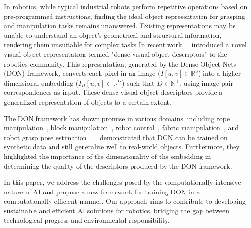In robotics, while typical industrial robots perform repetitive operations based on pre-programmed instructions,
finding the ideal object representation for grasping and manipulation tasks remains unanswered.
Existing representations may be unable to understand an object's geometrical and structural information, rendering them unsuitable for complex tasks
In recent work, \citeauthor{florence2018dense}~\cite{florence2018dense} introduced a novel visual object representation termed "dense visual object descriptors" to the robotics community.
This representation, generated by the Dense Object Nets (DON) framework, converts each pixel in an image ($I[u, v] \in \mathbb{R}^3$)
into a higher-dimensional embedding ($I_D[u, v] \in \mathbb{R}^D$) such that $D \in \mathbb{N}^+$,
using image-pair correspondences as input. These dense visual object descriptors provide a generalized representation of objects to a certain extent.


The DON framework has shown promise in various domains, including rope manipulation~\cite{rope-manipulation},
block manipulation~\cite{block-manipulation}, robot control~\cite{florence2019self}, fabric manipulation~\cite{fabric-manipulation},
and robot grasp pose estimation~\parencites{kupcsik2021supervised}{adrian2022efficient}. \citeauthor{adrian2022efficient}~\cite{adrian2022efficient}
demonstrated that DON can be trained on
synthetic data and still generalize well to real-world objects. Furthermore, they highlighted the importance of the
dimensionality of the embedding in determining the quality of the descriptors produced by the DON framework.


In this paper, we address the challenges posed by the computationally intensive nature of AI and propose a new framework for training DON in a computationally efficient manner.
Our approach aims to contribute to developing sustainable and efficient AI solutions for robotics, bridging the gap between technological progress and environmental responsibility.